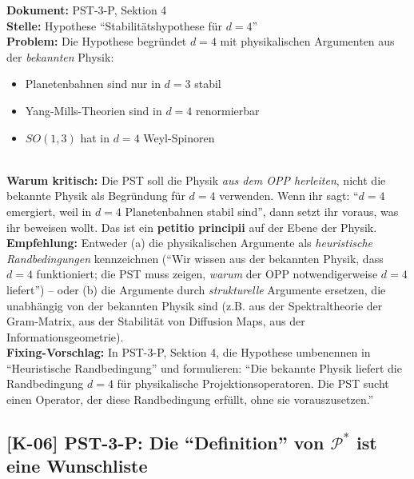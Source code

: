 \documentclass[11pt,a4paper]{article}
\newcommand{\K}[1]{\textbf{[K-#1]}}
\newcommand{\Dok}[1]{\textbf{Dokument:} #1\\}
\newcommand{\Stelle}[1]{\textbf{Stelle:} #1\\}
\newcommand{\Prob}[1]{\textbf{Problem:} #1\\}
\newcommand{\Krit}[1]{\textbf{Warum kritisch:} #1\\}
\newcommand{\Empf}[1]{\textbf{Empfehlung:} #1\\}
\newcommand{\Fix}[1]{\textbf{Fixing-Vorschlag:} #1\\}
\begin{document}
\Dok{PST-3-P, Sektion 4}
\Stelle{Hypothese ``Stabilit\"{a}tshypothese f\"{u}r $d = 4$''}
\Prob{Die Hypothese begr\"{u}ndet $d = 4$ mit physikalischen Argumenten
aus der \emph{bekannten} Physik:
\begin{itemize}
  \item Planetenbahnen sind nur in $d = 3$ stabil
  \item Yang-Mills-Theorien sind in $d = 4$ renormierbar
  \item $SO(1,3)$ hat in $d = 4$ Weyl-Spinoren
\end{itemize}}
\Krit{Die PST soll die Physik \emph{aus dem OPP herleiten}, nicht die
bekannte Physik als Begr\"{u}ndung f\"{u}r $d = 4$ verwenden. Wenn ihr
sagt: ``$d = 4$ emergiert, weil in $d = 4$ Planetenbahnen stabil
sind'', dann setzt ihr voraus, was ihr beweisen wollt. Das ist ein
\textbf{petitio principii} auf der Ebene der Physik.}
\Empf{Entweder (a) die physikalischen Argumente als \emph{heuristische
Randbedingungen} kennzeichnen (``Wir wissen aus der bekannten Physik,
dass $d = 4$ funktioniert; die PST muss zeigen, \emph{warum} der OPP
notwendigerweise $d = 4$ liefert'') -- oder (b) die Argumente durch
\emph{strukturelle} Argumente ersetzen, die unabh\"{a}ngig von der
bekannten Physik sind (z.B. aus der Spektraltheorie der Gram-Matrix,
aus der Stabilit\"{a}t von Diffusion Maps, aus der
Informationsgeometrie).}
\Fix{In PST-3-P, Sektion 4, die Hypothese umbenennen in
``Heuristische Randbedingung'' und formulieren: ``Die bekannte Physik
liefert die Randbedingung $d = 4$ f\"{u}r physikalische
Projektionsoperatoren. Die PST sucht einen Operator, der diese
Randbedingung erf\"{u}llt, ohne sie vorauszusetzen.''}

\subsection{\K{06} PST-3-P: Die ``Definition'' von $\mathcal{P}^*$ ist eine Wunschliste}
\end{document}

